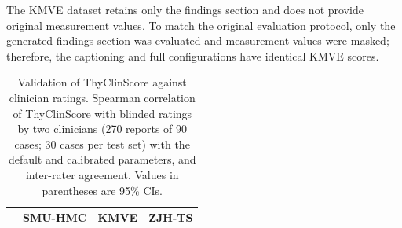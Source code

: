 \documentclass[fleqn,10pt]{wlscirep}
\begin{document}
\begin{appendices}
\begin{table}[p]
\begin{threeparttable}
\begin{tablenotes}[flushleft]
\footnotesize
\item The KMVE dataset retains only the findings section and does not provide original measurement values. To match the original evaluation protocol, only the generated findings section was evaluated and measurement values were masked; therefore, the captioning and full configurations have identical KMVE scores.
\end{tablenotes}

\end{threeparttable}
\end{table}
\clearpage

\begin{table}[p]
\centering
\begin{threeparttable}
\caption{Validation of ThyClinScore against clinician ratings. Spearman correlation of ThyClinScore with blinded ratings by two clinicians (270 reports of 90 cases; 30 cases per test set) with the default and calibrated parameters, and inter-rater agreement. Values in parentheses are 95\% CIs.}
\label{tab:thyclinscore_clinician}

\footnotesize
\setlength{\tabcolsep}{5.0pt}
\renewcommand{\arraystretch}{1.08}

\begin{tabular}{>{\raggedright\arraybackslash}p{}ccc}
\toprule
& \textbf{SMU-HMC} & \textbf{KMVE} & \textbf{ZJH-TS} \\
\midrule


\end{tabular}
\end{threeparttable}
\end{table}
\end{appendices}
\end{document}
